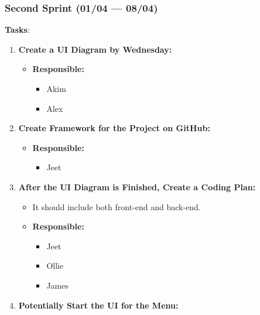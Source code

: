 \documentclass[11pt]{article}
\begin{document}
\hypertarget{second-sprint-0104-0804}{%
\subsubsection{Second Sprint (01/04 ---
08/04)}\label{second-sprint-0104-0804}}

\textbf{Tasks}:

\begin{enumerate}
\def\labelenumi{\arabic{enumi}.}
\tightlist
\item
  \textbf{Create a UI Diagram by Wednesday:}

  \begin{itemize}
  \tightlist
  \item
    \textbf{Responsible:}

    \begin{itemize}
    \tightlist
    \item
      Akim
    \item
      Alex
    \end{itemize}
  \end{itemize}
\item
  \textbf{Create Framework for the Project on GitHub:}

  \begin{itemize}
  \tightlist
  \item
    \textbf{Responsible:}

    \begin{itemize}
    \tightlist
    \item
      Jeet
    \end{itemize}
  \end{itemize}
\item
  \textbf{After the UI Diagram is Finished, Create a Coding Plan:}

  \begin{itemize}
  \tightlist
  \item
    It should include both front-end and back-end.
  \item
    \textbf{Responsible:}

    \begin{itemize}
    \tightlist
    \item
      Jeet
    \item
      Ollie
    \item
      James
    \end{itemize}
  \end{itemize}
\item
  \textbf{Potentially Start the UI for the Menu:}


\end{enumerate}
\end{document}
